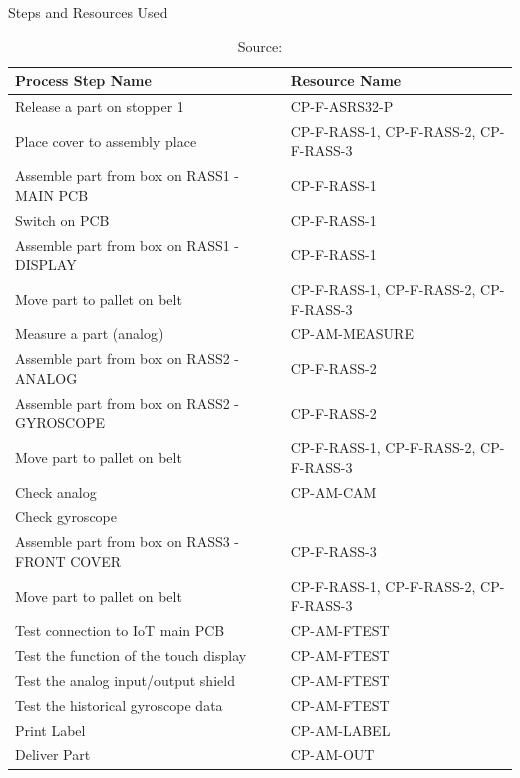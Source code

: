 \begin{table}[H]
  \centering
  \footnotesize
  \caption[Production steps and resources]{Steps and Resources Used}
  \label{tab:description-resources}
  \begin{tabular}{@{}p{}p{}@{}}
    \toprule
    \textbf{Process Step Name}                    & \textbf{Resource Name}                \\
    \midrule
    Release a part on stopper 1                   & CP-F-ASRS32-P                         \\
    Place cover to assembly place                 & CP-F-RASS-1, CP-F-RASS-2, CP-F-RASS-3 \\
    Assemble part from box on RASS1 - MAIN PCB    & CP-F-RASS-1                           \\
    Switch on PCB                                 & CP-F-RASS-1                           \\
    Assemble part from box on RASS1 - DISPLAY     & CP-F-RASS-1                           \\
    Move part to pallet on belt                   & CP-F-RASS-1, CP-F-RASS-2, CP-F-RASS-3 \\
    Measure a part (analog)                       & CP-AM-MEASURE                         \\
    Assemble part from box on RASS2 - ANALOG      & CP-F-RASS-2                           \\
    Assemble part from box on RASS2 - GYROSCOPE   & CP-F-RASS-2                           \\
    Move part to pallet on belt                   & CP-F-RASS-1, CP-F-RASS-2, CP-F-RASS-3 \\
    Check analog                                  & CP-AM-CAM                             \\
    Check gyroscope                               &                                       \\
    Assemble part from box on RASS3 - FRONT COVER & CP-F-RASS-3                           \\
    Move part to pallet on belt                   & CP-F-RASS-1, CP-F-RASS-2, CP-F-RASS-3 \\
    Test connection to IoT main PCB               & CP-AM-FTEST                           \\
    Test the function of the touch display        & CP-AM-FTEST                           \\
    Test the analog input/output shield           & CP-AM-FTEST                           \\
    Test the historical gyroscope data            & CP-AM-FTEST                           \\
    Print Label                                   & CP-AM-LABEL                           \\
    Deliver Part                                  & CP-AM-OUT                             \\
    \bottomrule
  \end{tabular}
  \caption*{Source: \Textcite{IoTFactory2024}}
\end{table}


